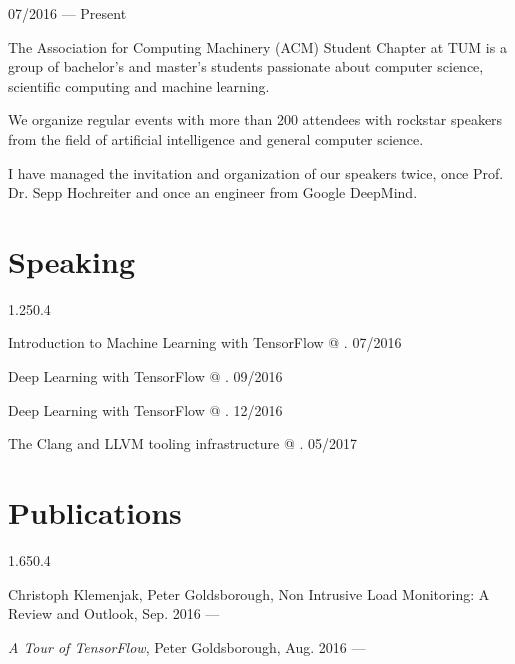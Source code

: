 \begin{entry}{}{}{07/2016 --- Present}
  \item The Association for Computing Machinery (ACM) Student Chapter at TUM is a group of bachelor's and master's students passionate about computer science, scientific computing and machine learning.
  \item We organize regular events with more than 200 attendees with rockstar speakers from the field of artificial intelligence and general computer science.
  \item I have managed the invitation and organization of our speakers twice, once Prof. Dr. Sepp Hochreiter and once an engineer from Google DeepMind.
\end{entry}

\vspace{-0.25cm}
\section{Speaking}{1.25}{0.4}
\begin{simpleentry}
  \item Introduction to Machine Learning with TensorFlow @ . \hspace{3cm} 07/2016
  \item Deep Learning with TensorFlow @ . \hspace{7.65cm} 09/2016
  \item Deep Learning with TensorFlow @ . \hspace{6.95cm} 12/2016
  \item The Clang and LLVM tooling infrastructure @ . \hspace{6.37cm} 05/2017
\end{simpleentry}

\vspace{-0.25cm}
\section{Publications}{1.65}{0.4}
\begin{simpleentry}
  \item Christoph Klemenjak, Peter Goldsborough, Non Intrusive Load Monitoring: A Review and Outlook, Sep. 2016 --- 
  \item \emph{A Tour of TensorFlow}, Peter Goldsborough, Aug. 2016 --- 
\end{simpleentry}

